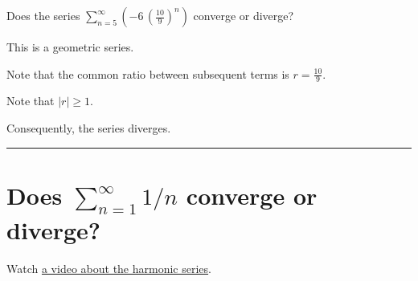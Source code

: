 \documentclass{ximera}
\begin{document}
\begin{question}
  Does the series \(\displaystyle\sum_{n=5}^\infty \left( -6 \, \left(\displaystyle\frac{10}{9}\right)^{n} \right)\) converge or diverge?

  \begin{solution}
    \begin{hint}
      This is a geometric series.
    \end{hint}
    \begin{hint}
      Note that the common ratio between subsequent terms is \(r = \displaystyle\frac{10}{9}\).
    \end{hint}
    \begin{hint}
      Note that \(|r| \geq 1\).
    \end{hint}
    \begin{hint}
      Consequently, the series diverges.
      
    \end{hint}
    

    \begin{multiple-choice}
    \end{multiple-choice}

  \end{solution}
\end{question}

\hrule
\section{Does $\displaystyle\sum_{n=1}^\infty 1/n$ converge or diverge?}

Watch \href{https://www.youtube.com/watch?v=_Ui5_-lIK34}{a video about the harmonic series}.
\end{document}
